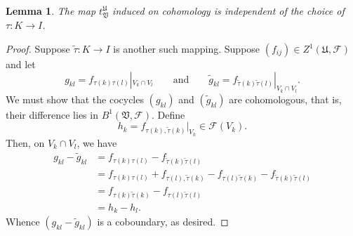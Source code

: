 \documentclass[10pt]{article}
\theoremstyle{thmstyle}
\newtheorem{lemma}[theorem]{Lemma}
\theoremstyle{defstyle}
\newcommand{\frakU}{\mathfrak{U}}
\newcommand{\frakV}{\mathfrak{V}}
\newcommand{\scrF}{\mathscr{F}}
\newcommand{\wt}[1]{\widetilde{#1}}
\begin{document}
\begin{lemma}
    The map $t^{\frakU}_{\frakV}$ induced on cohomology is independent of the choice of $\tau: K\to I$.
\end{lemma}
\begin{proof}
    Suppose $\wt\tau: K\to I$ is another such mapping. Suppose $(f_{ij})\in Z^1(\frakU,\scrF)$ and let 
    \begin{equation*}
        g_{kl} = f_{\tau(k)\tau(l)}|_{V_k\cap V_l}\qquad\text{and}\qquad\wt g_{kl} = f_{\wt\tau(k)\wt\tau(l)}|_{V_k\cap V_l}.
    \end{equation*}
    We must show that the cocycles $(g_{kl})$ and $(\wt g_{kl})$ are cohomologous, that is, their difference lies in $B^1(\frakV,\scrF)$. Define
    \begin{equation*}
        h_k = f_{\tau(k),\wt\tau(k)}|_{V_k}\in\scrF(V_k).
    \end{equation*}
    Then, on $V_k\cap V_l$, we have 
    \begin{align*}
        g_{kl} - \wt g_{kl} &= f_{\tau(k)\tau(l)} - f_{\wt\tau(k)\wt\tau(l)}\\
        &= f_{\tau(k)\tau(l)} + f_{\tau(l),\wt\tau(k)} - f_{\tau(l)\wt\tau(k)} - f_{\wt\tau(k)\wt\tau(l)}\\
        &= f_{\tau(k)\wt\tau(k)} - f_{\tau(l)\wt\tau(l)}\\
        &= h_k - h_l.
    \end{align*}
    Whence $(g_{kl} - \wt g_{kl})$ is a coboundary, as desired.
\end{proof}
\end{document}
